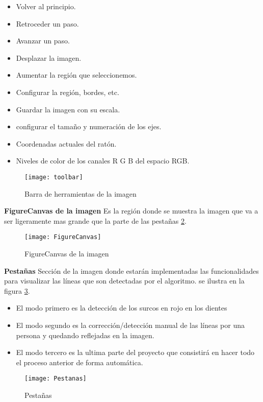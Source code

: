 \begin{itemize}
\item Volver al principio. 
\item Retroceder un paso.
\item Avanzar un paso.
\item Desplazar la imagen.
\item Aumentar la región que seleccionemos.
\item Configurar la región, bordes, etc.
\item Guardar la imagen con su escala.
\item configurar el tamaño y numeración de los ejes.
\item Coordenadas actuales del ratón.
\item Niveles de color de los canales R G B del espacio RGB.
\end{itemize}

\begin{figure}[h]
\centering
\texttt{[image: toolbar]}
\caption{Barra de herramientas de la imagen}\label{fig:5.11}
\end{figure}


\textbf{FigureCanvas de la imagen}
Es la región donde se muestra la imagen que va a ser ligeramente mas grande que la parte de las pestañas \ref{fig:5.12}.
\begin{figure}[h]
\centering
\texttt{[image: FigureCanvas]}
\caption{FigureCanvas de la imagen}
\label{fig:5.12}
\end{figure}


\textbf{Pestañas}
Sección de la imagen donde estarán implementadas las funcionalidades para visualizar las líneas que son detectadas por el algoritmo. se ilustra en la figura \ref{fig:5.13}.
\begin{itemize}
\item El modo primero es la detección de los surcos en rojo en los dientes 
\item El modo segundo es la corrección/detección manual de las líneas por una persona y quedando reflejadas en la imagen.
\item El modo tercero es la ultima parte del proyecto que consistirá en hacer todo el proceso anterior de forma automática.
\end{itemize}

\begin{figure}[h]
\centering
\texttt{[image: Pestanas]}
\caption{Pestañas}
\label{fig:5.13}
\end{figure}

